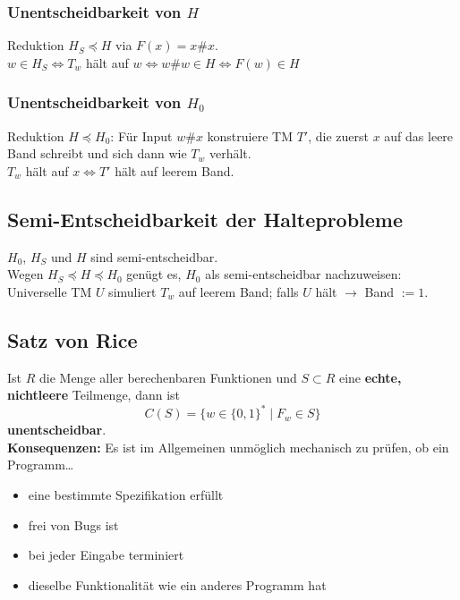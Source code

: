 \subsubsection{Unentscheidbarkeit von $H$}
Reduktion $H_S \preceq H$ via $F(x) = x\#x$.\\
$w \in H_S \Leftrightarrow T_w$ hält auf $w \Leftrightarrow w\#w \in H \Leftrightarrow F(w) \in H$

\subsubsection{Unentscheidbarkeit von $H_0$}
Reduktion $H \preceq H_0$: Für Input $w\#x$ konstruiere TM $T'$, die zuerst $x$ auf das leere Band schreibt und sich dann wie $T_w$ verhält.\\
$T_w$ hält auf $x \Leftrightarrow T'$ hält auf leerem Band.

\subsection{Semi-Entscheidbarkeit der Halteprobleme}
$H_0$, $H_S$ und $H$ sind semi-entscheidbar.\\
Wegen $H_S \preceq H \preceq H_0$ genügt es, $H_0$ als semi-entscheidbar nachzuweisen: Universelle TM $U$ simuliert $T_w$ auf leerem Band; falls $U$ hält $\to$ Band $:= 1$.

\subsection{Satz von Rice}
Ist $R$ die Menge aller berechenbaren Funktionen und $S \subset R$ eine \textbf{echte, nichtleere} Teilmenge, dann ist
\[
    C(S) = \{w \in \{0,1\}^* \mid F_w \in S\}
\]
\textbf{unentscheidbar}.\\
\textbf{Konsequenzen:} Es ist im Allgemeinen unmöglich mechanisch zu prüfen, ob ein Programm\ldots
\begin{itemize}
    \item eine bestimmte Spezifikation erfüllt
    \item frei von Bugs ist
    \item bei jeder Eingabe terminiert
    \item dieselbe Funktionalität wie ein anderes Programm hat
\end{itemize}